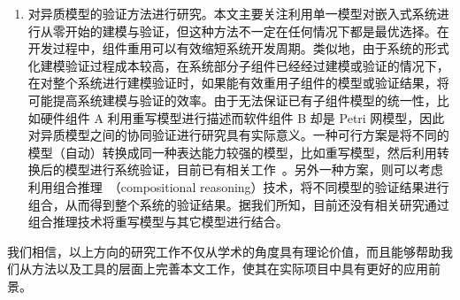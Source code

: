 \begin{enumerate}
\item 
对异质模型的验证方法进行研究。本文主要关注利用单一模型对嵌入式系统进行从零开始的建模与验证，但这种方法不一定在任何情况下都是最优选择。在开发过程中，组件重用可以有效缩短系统开发周期。类似地，由于系统的形式化建模验证过程成本较高，在系统部分子组件已经经过建模或验证的情况下，在对整个系统进行建模验证时，如果能有效重用子组件的模型或验证结果，将可能提高系统建模与验证的效率。由于无法保证已有子组件模型的统一性，比如硬件组件 A 利用重写模型进行描述而软件组件 B 却是 Petri 网模型，因此对异质模型之间的协同验证进行研究具有实际意义。一种可行方案是将不同的模型（自动）转换成同一种表达能力较强的模型，比如重写模型，然后利用转换后的模型进行系统验证，目前已有相关工作~\cite{DBLP:journals/scp/BaeOFLT12,DBLP:conf/forte/OlveczkyBM10}。另外一种方案，则可以考虑利用组合推理~\cite{DBLP:journals/toplas/AbadiL95}（compositional reasoning）技术，将不同模型的验证结果进行组合，从而得到整个系统的验证结果。据我们所知，目前还没有相关研究通过组合推理技术将重写模型与其它模型进行结合。
\end{enumerate} 

我们相信，以上方向的研究工作不仅从学术的角度具有理论价值，而且能够帮助我们从方法以及工具的层面上完善本文工作，使其在实际项目中具有更好的应用前景。